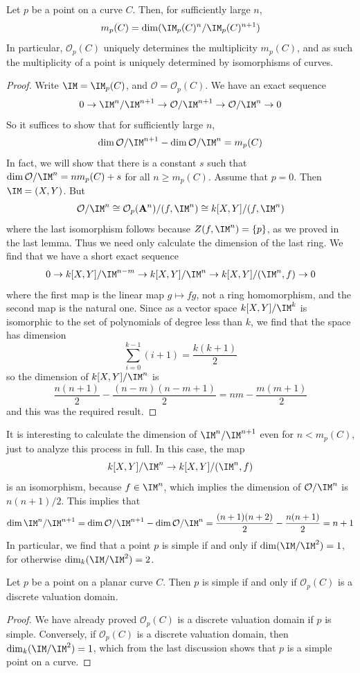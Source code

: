 \begin{prop}
    Let $p$ be a point on a curve $C$. Then, for sufficiently large $n$,
    \[ m_p(C) = \dim(\IM_p(C)^n/\IM_p(C)^{n+1}) \]
    In particular, $\mathcal{O}_p(C)$ uniquely determines the multiplicity $m_p(C)$, and as such the multiplicity of a point is uniquely determined by isomorphisms of curves.
\end{prop}
\begin{proof}
    Write $\IM = \IM_p(C)$, and $\mathcal{O} = \mathcal{O}_p(C)$. We have an exact sequence
    \[ 0 \to \IM^n/\IM^{n+1} \to \mathcal{O}/\IM^{n+1} \to \mathcal{O}/\IM^n \to 0 \]
    So it suffices to show that for sufficiently large $n$,
    \[ \dim \mathcal{O}/\IM^{n+1} - \dim \mathcal{O}/\IM^n = m_p(C) \]
    In fact, we will show that there is a constant $s$ such that $\dim \mathcal{O}/\IM^n = nm_p(C) + s$ for all $n \geq m_p(C)$. Assume that $p = 0$. Then $\IM = (X,Y)$. But
    \[ \mathcal{O}/\IM^n \cong \mathcal{O}_p(\mathbf{A}^n)/(f,\IM^n) \cong k[X,Y]/(f,\IM^n) \]
    where the last isomorphism follows because $Z(f,\IM^n) = \{ p \}$, as we proved in the last lemma. Thus we need only calculate the dimension of the last ring. We find that we have a short exact sequence
    \[ 0 \to k[X,Y]/\IM^{n-m} \to k[X,Y]/\IM^n \to k[X,Y]/(\IM^n,f) \to 0 \]
    where the first map is the linear map $g \mapsto fg$, not a ring homomorphism, and the second map is the natural one. Since as a vector space $k[X,Y]/\IM^k$ is isomorphic to the set of polynomials of degree less than $k$, we find that the space has dimension
    \[ \sum_{i = 0}^{k-1} (i+1) = \frac{k(k+1)}{2} \]
    so the dimension of $k[X,Y]/\IM^n$ is
    \[ \frac{n(n+1)}{2} - \frac{(n-m)(n-m+1)}{2} = nm - \frac{m(m+1)}{2} \]
    and this was the required result.
\end{proof}

It is interesting to calculate the dimension of $\IM^n/\IM^{n+1}$ even for $n < m_p(C)$, just to analyze this process in full. In this case, the map
%
\[ k[X,Y]/\IM^n \to k[X,Y]/(\IM^n,f) \]
%
is an isomorphism, because $f \in \IM^n$, which implies the dimension of $\mathcal{O}/\IM^n$ is $n(n+1)/2$. This implies that
%
\[ \dim \IM^n/\IM^{n+1} = \dim \mathcal{O}/\IM^{n+1} - \dim \mathcal{O}/\IM^n = \frac{(n+1)(n+2)}{2} - \frac{n(n+1)}{2} = n + 1 \]
%
In particular, we find that a point $p$ is simple if and only if $\dim(\IM/\IM^2) = 1$, for otherwise $\dim_k(\IM/\IM^2) = 2$.

\begin{corollary}
    Let $p$ be a point on a planar curve $C$. Then $p$ is simple if and only if $\mathcal{O}_p(C)$ is a discrete valuation domain.
\end{corollary}
\begin{proof}
    We have already proved $\mathcal{O}_p(C)$ is a discrete valuation domain if $p$ is simple. Conversely, if $\mathcal{O}_p(C)$ is a discrete valuation domain, then $\dim_k(\IM/\IM^2) = 1$, which from the last discussion shows that $p$ is a simple point on a curve.
\end{proof}

